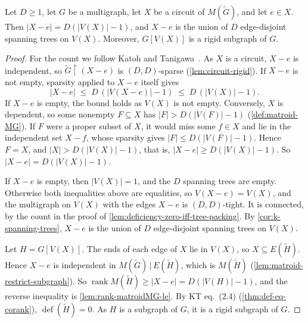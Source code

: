 \begin{lemma}
  \label{lem:circuit-induces-rigid}
  \leanok
  Let $D \ge 1$, let $G$ be a multigraph, let $X$ be a circuit of
  $M(\tilde G)$, and let $e \in X$. Then $|X - e| = D(|V(X)| - 1)$, and
  $X - e$ is the union of $D$ edge-disjoint spanning trees on $V(X)$.
  Moreover, $G[V(X)]$ is a rigid subgraph of $G$.
\end{lemma}
\begin{proof}
  \leanok
  For the count we follow Katoh and
  Tanigawa~\cite[p.~658]{katohTanigawa2011}. As $X$ is a circuit, $X - e$
  is independent, so $\tilde G \restriction (X - e)$ is $(D, D)$-sparse
  (\cref{lem:circuit-rigid}). If $X - e$ is not empty, sparsity applied
  to $X - e$ itself gives
  \[
    |X - e| \;\le\; D\,(|V(X - e)| - 1) \;\le\; D\,(|V(X)| - 1).
  \]
  If $X - e$ is empty, the bound holds as $V(X)$ is not empty.
  Conversely, $X$ is dependent, so some nonempty $F \subseteq X$ has
  $|F| > D(|V(F)| - 1)$ (\cref{def:matroid-MG}). If $F$ were a proper
  subset of $X$, it would miss some $f \in X$ and lie in the independent
  set $X - f$, whose sparsity gives $|F| \le D(|V(F)| - 1)$. Hence
  $F = X$, and $|X| > D(|V(X)| - 1)$, that is,
  $|X - e| \ge D(|V(X)| - 1)$. So $|X - e| = D(|V(X)| - 1)$.

  If $X - e$ is empty, then $|V(X)| = 1$, and the $D$ spanning trees are
  empty. Otherwise both inequalities above are equalities, so
  $V(X - e) = V(X)$, and the multigraph on $V(X)$ with the edges $X - e$
  is $(D, D)$-tight. It is connected, by the count in the proof of
  \cref{lem:deficiency-zero-iff-tree-packing}. By
  \cref{cor:k-spanning-trees}, $X - e$ is the union of $D$ edge-disjoint
  spanning trees on $V(X)$.

  Let $H = G[V(X)]$. The ends of each edge of $X$ lie in $V(X)$, so
  $X \subseteq E(\tilde H)$. Hence $X - e$ is independent in
  $M(\tilde G)\,|\,E(\tilde H)$, which is $M(\tilde H)$
  (\cref{lem:matroid-restrict-subgraph}). So
  $\operatorname{rank} M(\tilde H) \ge |X - e| = D(|V(H)| - 1)$, and the
  reverse inequality is \cref{lem:rank-matroidMG-le}. By KT eq.~(2.4)
  (\cref{thm:def-eq-corank}), $\operatorname{def}(\tilde H) = 0$. As $H$
  is a subgraph of $G$, it is a rigid subgraph of $G$.
\end{proof}

